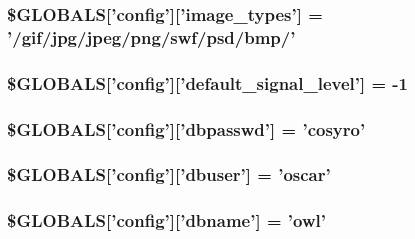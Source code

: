 \hypertarget{config_8php_335a0ed5b0fc63ef47f9ba1d91e41dc6}{
\subsubsection{\setlength{\rightskip}{0pt plus 5cm}\$GLOBALS\mbox{[}'config'\mbox{]}\mbox{[}'image\_\-types'\mbox{]} = '/gif/jpg/jpeg/png/swf/psd/bmp/'}}
\label{config_8php_335a0ed5b0fc63ef47f9ba1d91e41dc6}


\hypertarget{config_8php_a6cb37c985e2e9c87e33663f4597fe26}{
\subsubsection{\setlength{\rightskip}{0pt plus 5cm}\$GLOBALS\mbox{[}'config'\mbox{]}\mbox{[}'default\_\-signal\_\-level'\mbox{]} = -1}}
\label{config_8php_a6cb37c985e2e9c87e33663f4597fe26}


\hypertarget{config_8php_78cd1155d12fb4bc06bf1e6f3ef9cce8}{
\subsubsection{\setlength{\rightskip}{0pt plus 5cm}\$GLOBALS\mbox{[}'config'\mbox{]}\mbox{[}'dbpasswd'\mbox{]} = 'cosyro'}}
\label{config_8php_78cd1155d12fb4bc06bf1e6f3ef9cce8}


\hypertarget{config_8php_c72170ea71ebed873ef2e3428dc68944}{
\subsubsection{\setlength{\rightskip}{0pt plus 5cm}\$GLOBALS\mbox{[}'config'\mbox{]}\mbox{[}'dbuser'\mbox{]} = 'oscar'}}
\label{config_8php_c72170ea71ebed873ef2e3428dc68944}


\hypertarget{config_8php_91c6a49f3dd2b8b0e6955cf2cf22d728}{
\subsubsection{\setlength{\rightskip}{0pt plus 5cm}\$GLOBALS\mbox{[}'config'\mbox{]}\mbox{[}'dbname'\mbox{]} = 'owl'}}
\label{config_8php_91c6a49f3dd2b8b0e6955cf2cf22d728}


